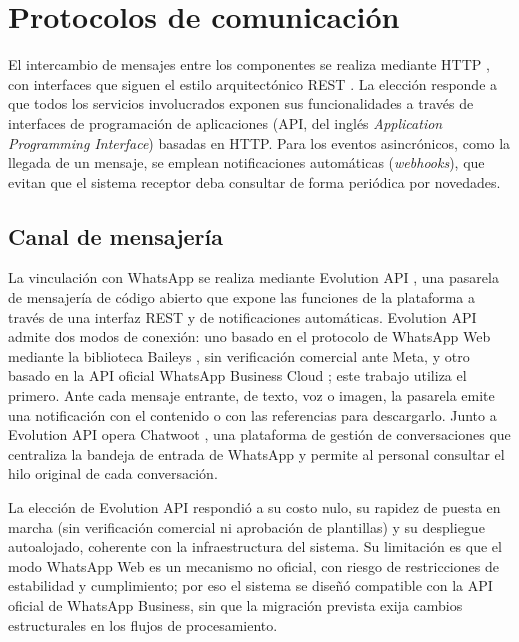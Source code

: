 \section{Protocolos de comunicación}
\label{sec:protocolos}

El intercambio de mensajes entre los componentes se realiza mediante HTTP \cite{rfc9110}, con interfaces que siguen el estilo arquitectónico REST \cite{fielding2000rest}. La elección responde a que todos los servicios involucrados exponen sus funcionalidades a través de interfaces de programación de aplicaciones (API, del inglés \textit{Application Programming Interface}) basadas en HTTP. Para los eventos asincrónicos, como la llegada de un mensaje, se emplean notificaciones automáticas (\textit{webhooks}), que evitan que el sistema receptor deba consultar de forma periódica por novedades.

\subsection{Canal de mensajería}
\label{subsec:whatsapp}

La vinculación con WhatsApp \cite{whatsapp} se realiza mediante Evolution API \cite{evolutionapi}, una pasarela de mensajería de código abierto que expone las funciones de la plataforma a través de una interfaz REST y de notificaciones automáticas. Evolution API admite dos modos de conexión: uno basado en el protocolo de WhatsApp Web mediante la biblioteca Baileys \cite{baileys}, sin verificación comercial ante Meta, y otro basado en la API oficial WhatsApp Business Cloud \cite{whatsappbusiness}; este trabajo utiliza el primero. Ante cada mensaje entrante, de texto, voz o imagen, la pasarela emite una notificación con el contenido o con las referencias para descargarlo. Junto a Evolution API opera Chatwoot \cite{chatwoot}, una plataforma de gestión de conversaciones que centraliza la bandeja de entrada de WhatsApp y permite al personal consultar el hilo original de cada conversación.

La elección de Evolution API respondió a su costo nulo, su rapidez de puesta en marcha (sin verificación comercial ni aprobación de plantillas) y su despliegue autoalojado, coherente con la infraestructura del sistema. Su limitación es que el modo WhatsApp Web es un mecanismo no oficial, con riesgo de restricciones de estabilidad y cumplimiento; por eso el sistema se diseñó compatible con la API oficial de WhatsApp Business, sin que la migración prevista exija cambios estructurales en los flujos de procesamiento.

